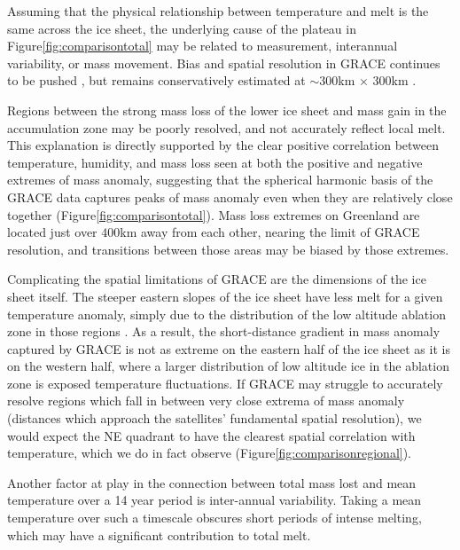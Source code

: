 \documentclass[11pt]{report}
\begin{document}

Assuming that the physical relationship between temperature and melt is the same across the ice sheet, the underlying cause of the plateau in Figure\ref{fig:comparisontotal} may be related to measurement, interannual variability, or mass movement. Bias and spatial resolution in GRACE continues to be pushed \cite[see][]{Harig+2012,save2016,getraerSpring}, but remains conservatively estimated at $\sim300$km $\times$ $300$km \cite[][; Greenland itself is approximately $2700$km North--South $\times$ $1200$km East--West]{scanlon2016}. 

Regions between the strong mass loss of the lower ice sheet and mass gain in the accumulation zone may be poorly resolved, and not accurately reflect local melt. This explanation is directly supported by the clear positive correlation between temperature, humidity, and mass loss seen at both the positive and negative extremes of mass anomaly, suggesting that the spherical harmonic basis of the GRACE data captures peaks of mass anomaly even when they are relatively close together (Figure\ref{fig:comparisontotal}). Mass loss extremes on Greenland are located just over $400$km away from each other, nearing the limit of GRACE resolution, and transitions between those areas may be biased by those extremes.

Complicating the spatial limitations of GRACE are the dimensions of the ice sheet itself. The steeper eastern slopes of the ice sheet have less melt for a given temperature anomaly, simply due to the distribution of the low altitude ablation zone in those regions \cite[][]{bevis2019}. As a result, the short-distance gradient in mass anomaly captured by GRACE is not as extreme on the eastern half of the ice sheet as it is on the western half, where a larger distribution of low altitude ice in the ablation zone is exposed temperature fluctuations. If GRACE may struggle to accurately resolve regions which fall in between very close extrema of mass anomaly (distances which approach the satellites' fundamental spatial resolution), we would expect the NE quadrant to have the clearest spatial correlation with temperature, which we do in fact observe (Figure\ref{fig:comparisonregional}).

Another factor at play in the connection between total mass lost and mean temperature over a 14 year period is inter-annual variability. Taking a mean temperature over such a timescale obscures short periods of intense melting, which may have a significant contribution to total melt.
\end{document}
